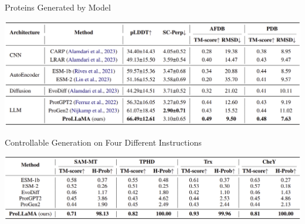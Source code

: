 \documentclass[dvipsnames]{beamer}
\begin{document}
\begin{frame}{Proteins Generated by Model}
	\begin{center}
		\includegraphics[scale=0.21]{tables/methods_comparison.png}
	\end{center}
\end{frame}

\begin{frame}{Controllable Generation on Four Different Instructions}
	\begin{center}
		\includegraphics[scale=0.21]{tables/controlled_generation_comparison.png}
	\end{center}
\end{frame}
\end{document}
